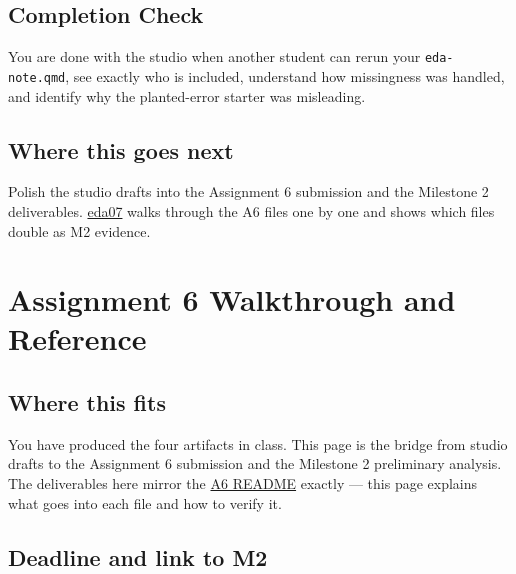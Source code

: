 \documentclass[
  letterpaper,
  DIV=11,
  numbers=noendperiod,
  oneside]{scrreprt}
\begin{document}
\section*{Completion Check}\label{completion-check-1}


You are done with the studio when another student can rerun your
\texttt{eda-note.qmd}, see exactly who is included, understand how
missingness was handled, and identify why the planted-error starter was
misleading.

\section*{Where this goes next}\label{where-this-goes-next-12}


Polish the studio drafts into the Assignment 6 submission and the
Milestone 2 deliverables.
\href{eda07-assignment-a6-and-reference.qmd}{eda07} walks through the A6
files one by one and shows which files double as M2 evidence.

\chapter*{Assignment 6 Walkthrough and
Reference}\label{assignment-6-walkthrough-and-reference}


\section*{Where this fits}\label{where-this-fits-11}


You have produced the four artifacts in class. This page is the bridge
from studio drafts to the Assignment 6 submission and the Milestone 2
preliminary analysis. The deliverables here mirror the
\href{../../assignments/assignment06-eda-ai-audit/README.md}{A6 README}
exactly --- this page explains what goes into each file and how to
verify it.

\section*{Deadline and link to M2}\label{deadline-and-link-to-m2}
\end{document}
